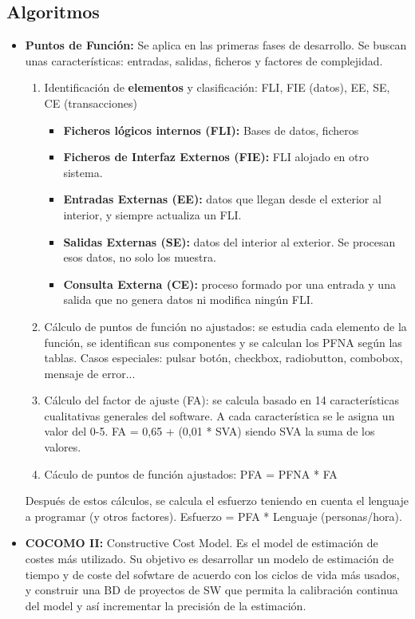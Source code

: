 \documentclass{article}
\begin{document}
\subsection{Algoritmos}
\begin{itemize}
	\item \textbf{Puntos de Función:} Se aplica en las primeras fases de desarrollo. Se buscan unas características: entradas, salidas, ficheros y factores de complejidad. 
	\begin{enumerate}
	\item Identificación de \textbf{elementos} y clasificación: FLI, FIE (datos), EE, SE, CE (transacciones)
	\begin{itemize}
		\item \textbf{Ficheros lógicos internos (FLI):} Bases de datos, ficheros
		\item \textbf{Ficheros de Interfaz Externos (FIE):} FLI alojado en otro sistema.
		\item \textbf{Entradas Externas (EE):} datos que llegan desde el exterior al interior, y siempre actualiza un FLI.
		\item \textbf{Salidas Externas (SE):} datos del interior al exterior. Se procesan esos datos, no solo los muestra.
		\item \textbf{Consulta Externa (CE):} proceso formado por una entrada y una salida que no genera datos ni modifica ningún FLI. 
	\end{itemize}
	\item Cálculo de puntos de función no ajustados: se estudia cada elemento de la función, se identifican sus componentes y se calculan los PFNA según las tablas. Casos especiales: pulsar botón, checkbox, radiobutton, combobox, mensaje de error...
	\item Cálculo del factor de ajuste (FA): se calcula basado en 14 características cualitativas generales del software. A cada característica se le asigna un valor del 0-5. FA = 0,65 + (0,01 * SVA) siendo SVA la suma de los valores. 
	\item Cáculo de puntos de función ajustados: PFA = PFNA * FA
	\end{enumerate}
	Después de estos cálculos, se calcula el esfuerzo teniendo en cuenta el lenguaje a programar (y otros factores). Esfuerzo = PFA * Lenguaje (personas/hora).
	\item \textbf{COCOMO II:}  Constructive Cost Model. Es el model de estimación de costes más utilizado. Su objetivo es desarrollar un modelo de estimación de tiempo y de coste del sofwtare de acuerdo con los ciclos de vida más usados, y construir una BD de proyectos de SW que permita la calibración continua del model y así incrementar la precisión de la estimación. 

\end{itemize}
\end{document}
